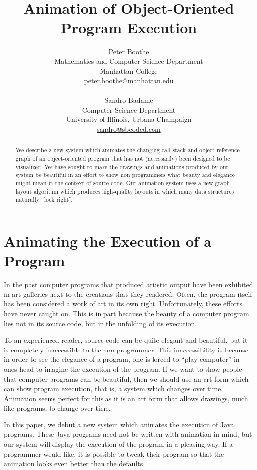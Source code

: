\documentclass[11pt]{article}
\title{\textbf{Animation of Object-Oriented Program Execution}}
\author{
 	Peter Boothe\\
	Mathematics and Computer Science Department \\
	Manhattan College \\
	\url{peter.boothe@manhattan.edu}\\
        \\
 	Sandro Badame \\
	Computer Science Department \\
	University of Illinois, Urbana-Champaign \\
	\url{sandro@sbcoded.com}
}
\date{}
\begin{document}
\maketitle

\thispagestyle{empty}

\begin{abstract}

We describe a new system which animates the changing call stack and object-reference graph of an object-oriented program that has not (necessarily) been designed to be visualized.  We have sought to make the drawings and animations produced by our system be beautiful in an effort to show non-programmers what beauty and elegance might mean in the context of source code.  Our animation system uses a new graph layout algorithm which produces high-quality layouts in which many data structures naturally ``look right''.

\end{abstract}

\section{Animating the Execution of a Program}

In the past computer programs that produced artistic output have been exhibited
in art galleries next to the creations that they rendered. Often, the
program itself has been considered a work of art in its own right.
 Unfortunately, these efforts have never caught on.  This is in part
because the beauty of a computer program lies not in its source code, but in
the unfolding of its execution.

To an experienced reader, source code can be quite elegant and beautiful, but
it is completely inaccessible to the non-programmer.  This inaccessibility is
because in order to see the elegance of a program, one is forced to ``play
computer'' in ones head to imagine the execution of the program.  If we want to
show people that computer programs can be beautiful, then we should use an art
form which can show program execution, that is, a system which changes over
time. Animation seems perfect for this as it is an art form that allows
drawings, much like programs, to change over time.

In this paper, we debut a new system which animates the execution of Java
programs.  These Java programs need not be written with animation in mind, but our
system will display the execution of the program in a pleasing way.
If a programmer would like, it is possible to tweak their program so that
the animation looks even better than the defaults.
\end{document}
